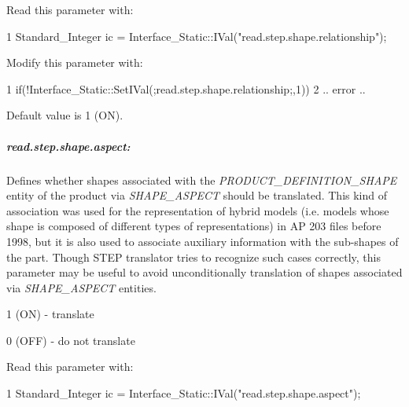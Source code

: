 Read this parameter with\+: 
\begin{DoxyCode}
1 Standard\_Integer ic =           Interface\_Static::IVal("read.step.shape.relationship");
\end{DoxyCode}
 Modify this parameter with\+: 
\begin{DoxyCode}
1 if(!Interface\_Static::SetIVal(;read.step.shape.relationship;,1))  
2 .. error .. 
\end{DoxyCode}
 Default value is 1 (ON).

\subparagraph*{read.\+step.\+shape.\+aspect\+:}

Defines whether shapes associated with the {\itshape P\+R\+O\+D\+U\+C\+T\+\_\+\+D\+E\+F\+I\+N\+I\+T\+I\+O\+N\+\_\+\+S\+H\+A\+PE} entity of the product via {\itshape S\+H\+A\+P\+E\+\_\+\+A\+S\+P\+E\+CT} should be translated. This kind of association was used for the representation of hybrid models (i.\+e. models whose shape is composed of different types of representations) in AP 203 files before 1998, but it is also used to associate auxiliary information with the sub-\/shapes of the part. Though S\+T\+EP translator tries to recognize such cases correctly, this parameter may be useful to avoid unconditionally translation of shapes associated via {\itshape S\+H\+A\+P\+E\+\_\+\+A\+S\+P\+E\+CT} entities.


\begin{DoxyItemize}
\item 1 (ON) -\/ translate
\item 0 (O\+FF) -\/ do not translate
\end{DoxyItemize}

Read this parameter with\+: 
\begin{DoxyCode}
1 Standard\_Integer ic =                   Interface\_Static::IVal("read.step.shape.aspect"); 
\end{DoxyCode}


